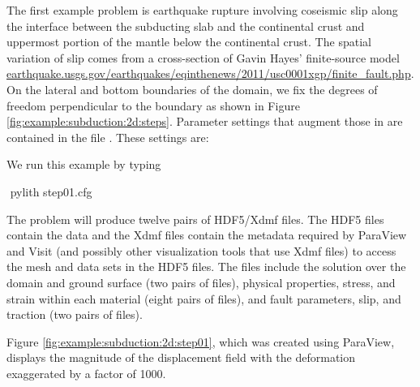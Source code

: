 The first example problem is earthquake rupture involving coseismic
slip along the interface between the subducting slab and the continental
crust and uppermost portion of the mantle below the continental crust.
The spatial variation of slip comes from a cross-section of Gavin
Hayes' finite-source model \url{earthquake.usgs.gov/earthquakes/eqinthenews/2011/usc0001xgp/finite_fault.php}.
On the lateral and bottom boundaries of the domain, we fix the degrees
of freedom perpendicular to the boundary as shown in Figure \vref{fig:example:subduction:2d:steps}.
Parameter settings that augment those in  are
contained in the file . These settings are:
\begin{inventory}
\end{inventory}
We run this example by typing
\begin{shell}
$$ pylith step01.cfg
\end{shell}
The problem will produce twelve pairs of HDF5/Xdmf files. The HDF5
files contain the data and the Xdmf files contain the metadata required
by ParaView and Visit (and possibly other visualization tools that
use Xdmf files) to access the mesh and data sets in the HDF5 files.
The files include the solution over the domain and ground surface
(two pairs of files), physical properties, stress, and strain within
each material (eight pairs of files), and fault parameters, slip,
and traction (two pairs of files). 

Figure \vref{fig:example:subduction:2d:step01}, which was created using
ParaView, displays the magnitude of the displacement field with the
deformation exaggerated by a factor of 1000. 


